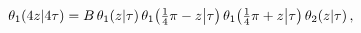 \[\mathop{\theta_{1}\/}\nolimits\!\left(4z\middle|4\tau\right)=B\mathop{\theta_{%
1}\/}\nolimits\!\left(z\middle|\tau\right)\mathop{\theta_{1}\/}\nolimits\!%
\left(\tfrac{1}{4}\pi-z\middle|\tau\right)\*\mathop{\theta_{1}\/}\nolimits\!%
\left(\tfrac{1}{4}\pi+z\middle|\tau\right)\mathop{\theta_{2}\/}\nolimits\!%
\left(z\middle|\tau\right),\]